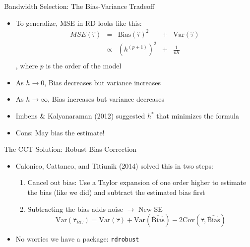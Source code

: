 \documentclass[]{beamer}
\begin{document}
\begin{frame}{Bandwidth Selection: The Bias-Variance Tradeoff}
    \begin{itemize}
        \item To generalize, MSE in RD looks like this:
            $$
            \begin{aligned}
                MSE(\hat{\tau}) &= &\text{Bias}(\hat{\tau})^2 &+ &\text{Var}(\hat{\tau}) \\ &\propto &(h^{(p + 1)})^2 &+ &\frac{1}{nh} \\
            \end{aligned}
            $$, where $p$ is the order of the model
        \item As $h \to 0$, Bias decreases but variance increases
        \item As $h \to \infty$, Bias increases but variance decreases
        \item Imbens \& Kalyanaraman (2012) suggested $h^*$ that minimizes the formula
        \item Cons: May bias the estimate!
    \end{itemize}
\end{frame}

\begin{frame}{The CCT Solution: Robust Bias-Correction}
    \begin{itemize}
        \item Calonico, Cattaneo, and Titiunik (2014) solved this in two steps:
        \begin{enumerate}
            \item Cancel out bias: Use a Taylor expansion of one order higher to estimate the bias (like we did) and subtract the estimated bias first
            \item Subtracting the bias adds noise $\to$ New SE
            $$ \text{Var}(\hat{\tau}_{BC}) = \text{Var}(\hat{\tau}) + \text{Var}(\widehat{\text{Bias}}) - 2\text{Cov}(\hat{\tau}, \widehat{\text{Bias}}) $$
        \end{enumerate}
        \item No worries we have a package: \texttt{rdrobust}
    \end{itemize}
\end{frame}
\end{document}
